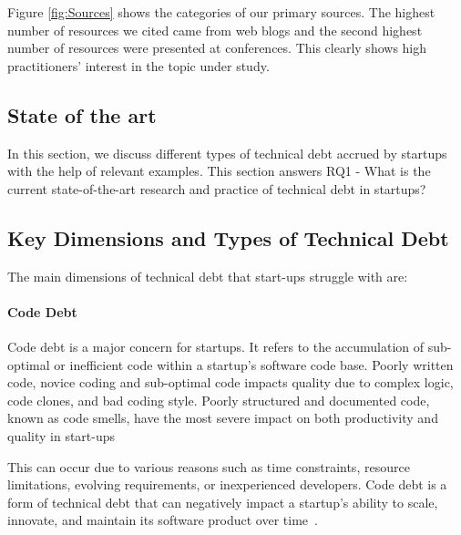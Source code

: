 Figure \ref{fig:Sources} shows the categories of our primary sources.
The highest number of resources we cited came from web blogs and the second highest number of resources were presented at conferences.
This clearly shows high practitioners' interest in the topic under study.


\subsection{State of the art}
In this section, we discuss different types of technical debt accrued by startups with the help of relevant examples. This section answers RQ1 - What is the current state-of-the-art research and practice of technical debt in startups?

\subsection{Key Dimensions and Types of Technical Debt}
The main dimensions of technical debt that start-ups struggle with are:

\paragraph{Code Debt} 
Code debt is a major concern for startups.
It refers to the accumulation of sub-optimal or inefficient code within a startup's software code base.
Poorly written code, novice coding and sub-optimal code impacts quality due to complex logic, code clones, and bad coding style.
Poorly structured and documented code, known as code smells, have the most severe impact on both productivity and quality in start-ups~\cite{Klotins2018/3183519.3183539}

This can occur due to various reasons such as time constraints, resource limitations, evolving requirements, or inexperienced developers.
Code debt is a form of technical debt that can negatively impact a startup's ability to scale, innovate, and maintain its software product over time~\cite{FowlerBottlenecks, Qualityv77:online}.

